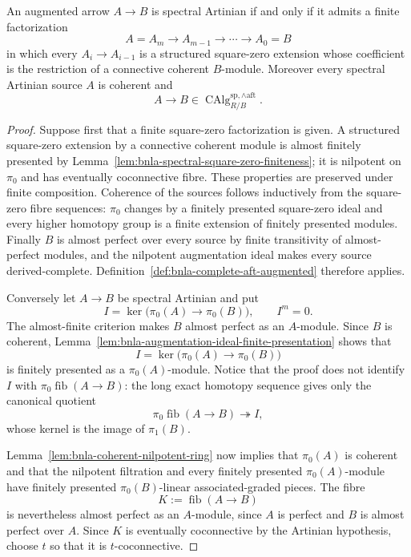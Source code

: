 \begin{proposition}
\label{prop:bnla-spectral-art-square-zero-generation}
An augmented arrow $A\to B$ is spectral Artinian if and only if it admits a
finite factorization
\[
    A=A_m\longrightarrow A_{m-1}\longrightarrow\cdots
    \longrightarrow A_0=B
\]
in which every $A_i\to A_{i-1}$ is a structured square-zero extension whose
coefficient is the restriction of a connective coherent $B$-module.
Moreover every spectral Artinian source $A$ is coherent and
\[
    A\to B
    \in
    \operatorname{CAlg}^{\mathrm{sp},\wedge\mathrm{aft}}_{R/B}.
\]
\end{proposition}

\begin{proof}
Suppose first that a finite square-zero factorization is given.  A structured
square-zero extension by a connective coherent module is almost finitely
presented by Lemma~\ref{lem:bnla-spectral-square-zero-finiteness}; it is
nilpotent on $\pi_0$ and has eventually coconnective fibre.  These properties
are preserved under finite composition.  Coherence of the sources follows
inductively from the square-zero fibre sequences: $\pi_0$ changes by a
finitely presented square-zero ideal and every higher homotopy group is a
finite extension of finitely presented modules.  Finally $B$ is almost
perfect over every source by finite transitivity of almost-perfect modules,
and the nilpotent augmentation ideal makes every source derived-complete.
Definition~\ref{def:bnla-complete-aft-augmented} therefore applies.

Conversely let $A\to B$ be spectral Artinian and put
\[
    I=\ker\bigl(\pi_0(A)\to\pi_0(B)\bigr),
    \qquad I^m=0.
\]
The almost-finite criterion makes $B$ almost perfect as an $A$-module.  Since
$B$ is coherent, Lemma~\ref{lem:bnla-augmentation-ideal-finite-presentation}
shows that
\[
    I=\ker\bigl(\pi_0(A)\to\pi_0(B)\bigr)
\]
is finitely presented as a $\pi_0(A)$-module.  Notice that the proof does not
identify $I$ with $\pi_0\operatorname{fib}(A\to B)$: the long exact homotopy
sequence gives only the canonical quotient
\[
    \pi_0\operatorname{fib}(A\to B)\twoheadrightarrow I,
\]
whose kernel is the image of $\pi_1(B)$.

Lemma~\ref{lem:bnla-coherent-nilpotent-ring} now implies that $\pi_0(A)$ is
coherent and that the nilpotent filtration and every finitely presented
$\pi_0(A)$-module have finitely presented $\pi_0(B)$-linear
associated-graded pieces.  The fibre
\[
    K:=\operatorname{fib}(A\to B)
\]
is nevertheless almost perfect as an $A$-module, since $A$ is perfect and
$B$ is almost perfect over $A$.  Since $K$ is eventually coconnective by the
Artinian hypothesis, choose $t$ so that it is $t$-coconnective.


\end{proof}
